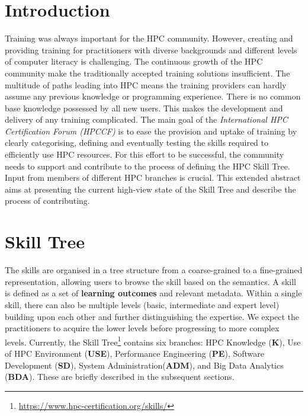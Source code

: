\documentclass[jocse]{jocseart}
\begin{document}
\maketitle

\section{Introduction}

Training was always important for the HPC community. However, creating and providing training for practitioners with diverse backgrounds and different levels of computer literacy is challenging. The continuous growth of the HPC community make the traditionally accepted training solutions insufficient. The multitude of paths leading into HPC means the training providers can hardly assume any previous knowledge or programming experience. There is no common base knowledge possessed by all new users. This makes the development and delivery of any training complicated.
The main goal of the \textit{International HPC Certification Forum (HPCCF)} is to ease the provision and uptake of training by clearly categorising, defining and eventually testing the skills required to efficiently use HPC resources. For this effort to be successful, the community needs to support and contribute to the process of defining the HPC Skill Tree. Input from members of different HPC branches is crucial. This extended abstract aims at presenting the current high-view state of the Skill Tree and describe the process of contributing.


\section{Skill Tree}

The skills are organised in a tree structure from a coarse-grained to a fine-grained representation, allowing users to browse the skill based on the semantics.
A skill is defined as a set of \textbf{learning outcomes} and relevant metadata. Within a single skill, there can also be multiple levels (basic, intermediate and expert level) building upon each other and further distinguishing the expertise. We expect the practitioners to acquire the lower levels before progressing to more complex levels.
Currently, the Skill Tree\footnote{\url{https://www.hpc-certification.org/skills/}} contains six branches: HPC Knowledge (\textbf{K}), Use of HPC Environment (\textbf{USE}), Performance Engineering (\textbf{PE}), Software Development (\textbf{SD}), System Administration(\textbf{ADM}), and Big Data Analytics (\textbf{BDA}). These are briefly described in the subsequent sections.
\end{document}
